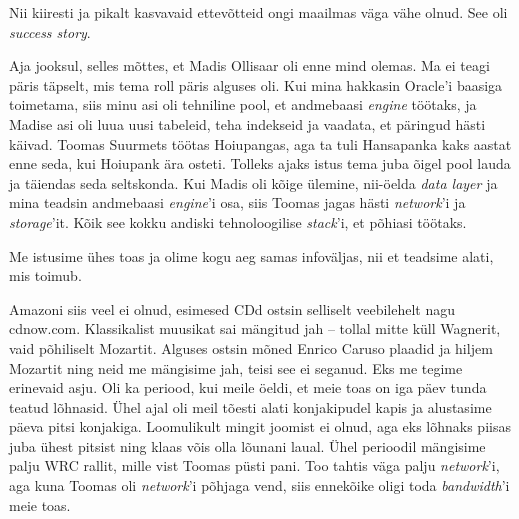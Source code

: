 
Nii kiiresti ja pikalt kasvavaid ettevõtteid ongi maailmas väga vähe olnud. See oli \emph{success story}.


Aja jooksul, selles mõttes, et Madis Ollisaar oli 
enne mind olemas. Ma ei teagi päris täpselt, mis tema roll päris alguses oli. 
Kui mina hakkasin Oracle'i baasiga toimetama, siis minu 
asi oli tehniline pool, et andmebaasi \emph{engine} töötaks, ja Madise 
asi oli luua uusi tabeleid, teha indekseid ja vaadata, et päringud hästi 
käivad. Toomas 
Suurmets töötas Hoiupangas, aga 
ta tuli Hansapanka kaks aastat enne seda, kui Hoiupank ära osteti. 
Tolleks ajaks istus tema juba õigel pool lauda ja täiendas seda seltskonda. Kui 
Madis oli kõige ülemine, nii-öelda \emph{data layer} ja mina teadsin 
andmebaasi \emph{engine}'i osa, siis Toomas jagas hästi \emph{network}'i 
ja \emph{storage}'it. Kõik see kokku andiski tehnoloogilise 
\emph{stack}'i, et põhiasi töötaks.


Me istusime ühes toas ja olime kogu aeg samas infoväljas, nii et teadsime alati, mis toimub.


Amazoni siis veel ei olnud, 
esimesed CDd ostsin selliselt veebilehelt nagu cdnow.com. 
Klassikalist muusikat sai mängitud jah -- tollal mitte küll 
Wagnerit, vaid põhiliselt Mozartit. 
Alguses ostsin mõned Enrico Caruso plaadid ja hiljem 
Mozartit ning neid me mängisime jah, teisi see ei seganud. Eks me tegime 
erinevaid asju. Oli ka periood, kui meile öeldi, et meie toas on iga päev tunda teatud lõhnasid. Ühel ajal oli meil tõesti alati 
konjakipudel kapis ja alustasime päeva pitsi konjakiga. Loomulikult 
mingit joomist ei olnud, aga eks lõhnaks piisas juba ühest pitsist ning klaas võis olla lõunani
laual. 
Ühel perioodil mängisime palju WRC rallit, mille vist Toomas püsti pani. Too tahtis väga palju \emph{network}'i, 
aga kuna Toomas oli \emph{network}'i põhjaga vend, siis ennekõike oligi toda 
\emph{bandwidth}'i meie toas.

